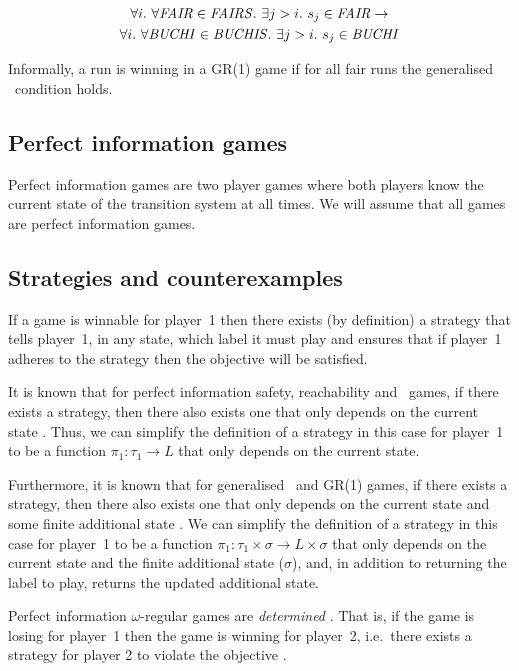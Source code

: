 \begin{multline}
\forall i.\ \forall \fairobj \in \genfairobj.\ \exists j>i.\ s_j \in \fairobj \rightarrow \\ \forall i.\ \forall \buchiobj \in \genbuchiobj.\ \exists j>i.\ s_j \in \buchiobj
\end{multline}

Informally, a run is winning in a GR(1) game if for all fair runs the generalised \buchi\ condition holds.

\subsection{Perfect information games}

Perfect information games are two player games where both players know the current state of the transition system at all times. We will assume that all games are perfect information games.

\subsection{Strategies and counterexamples}
\label{sec:strat_and_cex}

If a game is winnable for player~1 then there exists (by definition) a strategy that tells player~1, in any state, which label it must play and ensures that if player~1 adheres to the strategy then the objective will be satisfied.

It is known that for perfect information safety, reachability and \buchi\ games, if there exists a strategy, then there also exists one that only depends on the current state \cite{something}. Thus, we can simplify the definition of a strategy in this case for player~1 to be a function $\pi_1 : \tau_1 \rightarrow L$ that only depends on the current state.

Furthermore, it is known that for generalised \buchi\ and GR(1) games, if there exists a strategy, then there also exists one that only depends on the current state and some finite additional state \cite{something}. We can simplify the definition of a strategy in this case for player~1 to be a function $\pi_1 : \tau_1 \times \sigma \rightarrow L \times \sigma$ that only depends on the current state and the finite additional state ($\sigma$), and, in addition to returning the label to play, returns the updated additional state.

Perfect information $\omega$-regular games are \emph{determined} . That is, if the game is losing for player~1 then the game is winning for player~2, i.e.\ there exists a strategy for player 2 to violate the objective \cite{something}.

